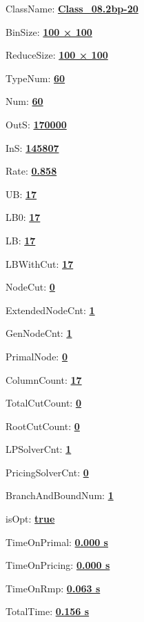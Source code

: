 \documentclass[11pt]{article}
\begin{document}
\pagestyle{empty}


ClassName: \underline{\textbf{Class_08.2bp-20}}
\par
BinSize: \underline{\textbf{100 × 100}}
\par
ReduceSize: \underline{\textbf{100 × 100}}
\par
TypeNum: \underline{\textbf{60}}
\par
Num: \underline{\textbf{60}}
\par
OutS: \underline{\textbf{170000}}
\par
InS: \underline{\textbf{145807}}
\par
Rate: \underline{\textbf{0.858}}
\par
UB: \underline{\textbf{17}}
\par
LB0: \underline{\textbf{17}}
\par
LB: \underline{\textbf{17}}
\par
LBWithCut: \underline{\textbf{17}}
\par
NodeCut: \underline{\textbf{0}}
\par
ExtendedNodeCnt: \underline{\textbf{1}}
\par
GenNodeCnt: \underline{\textbf{1}}
\par
PrimalNode: \underline{\textbf{0}}
\par
ColumnCount: \underline{\textbf{17}}
\par
TotalCutCount: \underline{\textbf{0}}
\par
RootCutCount: \underline{\textbf{0}}
\par
LPSolverCnt: \underline{\textbf{1}}
\par
PricingSolverCnt: \underline{\textbf{0}}
\par
BranchAndBoundNum: \underline{\textbf{1}}
\par
isOpt: \underline{\textbf{true}}
\par
TimeOnPrimal: \underline{\textbf{0.000 s}}
\par
TimeOnPricing: \underline{\textbf{0.000 s}}
\par
TimeOnRmp: \underline{\textbf{0.063 s}}
\par
TotalTime: \underline{\textbf{0.156 s}}
\par
\newpage


\end{document}
